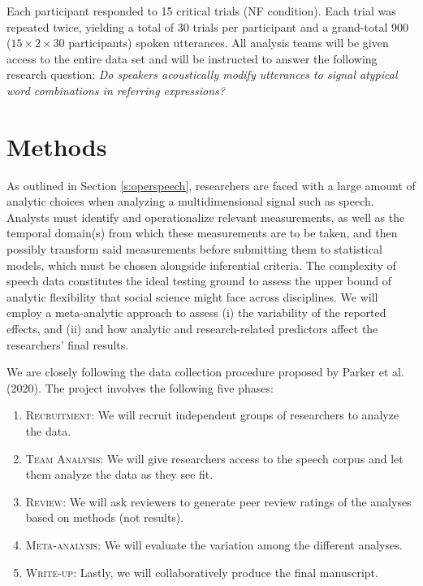 \documentclass[
  12pt,
]{article}
\providecommand{\tightlist}{%
  \setlength{\itemsep}{0pt}\setlength{\parskip}{0pt}}
\begin{document}
Each participant responded to 15 critical trials (NF condition).
Each trial was repeated twice, yielding a total of 30 trials per participant and a grand-total 900 (\(15 \times 2 \times 30\) participants) spoken utterances.
All analysis teams will be given access to the entire data set and will be instructed to answer the following research question: \emph{Do speakers acoustically modify utterances to signal atypical word combinations in referring expressions?}

\hypertarget{methods}{%
\section{Methods}\label{methods}}

As outlined in Section \ref{s:operspeech}, researchers are faced with a large amount of analytic choices when analyzing a multidimensional signal such as speech.
Analysts must identify and operationalize relevant measurements, as well as the temporal domain(s) from which these measurements are to be taken, and then possibly transform said measurements before submitting them to statistical models, which must be chosen alongside inferential criteria.
The complexity of speech data constitutes the ideal testing ground to assess the upper bound of analytic flexibility that social science might face across disciplines.
We will employ a meta-analytic approach to assess (i) the variability of the reported effects, and (ii) and how analytic and research-related predictors affect the researchers' final results.

We are closely following the data collection procedure proposed by Parker et al. (2020).
The project involves the following five phases:

\begin{enumerate}
\def\labelenumi{\arabic{enumi}.}
\tightlist
\item
  \textsc{Recruitment}: We will recruit independent groups of researchers to analyze the data.
\item
  \textsc{Team Analysis}: We will give researchers access to the speech corpus and let them analyze the data as they see fit.
\item
  \textsc{Review}: We will ask reviewers to generate peer review ratings of the analyses based on methods (not results).
\item
  \textsc{Meta-analysis}: We will evaluate the variation among the different analyses.
\item
  \textsc{Write-up}: Lastly, we will collaboratively produce the final manuscript.
\end{enumerate}
\end{document}
